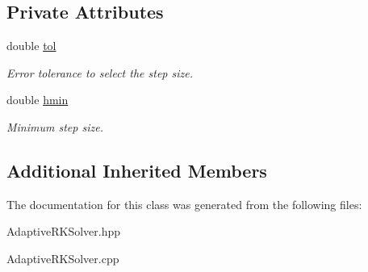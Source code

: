 \subsection*{Private Attributes}
\begin{DoxyCompactItemize}
\item 
\mbox{\label{classAdaptiveRKSolver_afc9af0ecd74d4b9a02a6ae5160949d86}} 
double \hyperlink{classAdaptiveRKSolver_afc9af0ecd74d4b9a02a6ae5160949d86}{tol}
\begin{DoxyCompactList}\small\item\em Error tolerance to select the step size. \end{DoxyCompactList}\item 
\mbox{\label{classAdaptiveRKSolver_a771a7c6efdafb13b75ac1f96ef484f46}} 
double \hyperlink{classAdaptiveRKSolver_a771a7c6efdafb13b75ac1f96ef484f46}{hmin}
\begin{DoxyCompactList}\small\item\em Minimum step size. \end{DoxyCompactList}\end{DoxyCompactItemize}
\subsection*{Additional Inherited Members}


The documentation for this class was generated from the following files\+:\begin{DoxyCompactItemize}
\item 
Adaptive\+R\+K\+Solver.\+hpp\item 
Adaptive\+R\+K\+Solver.\+cpp\end{DoxyCompactItemize}
